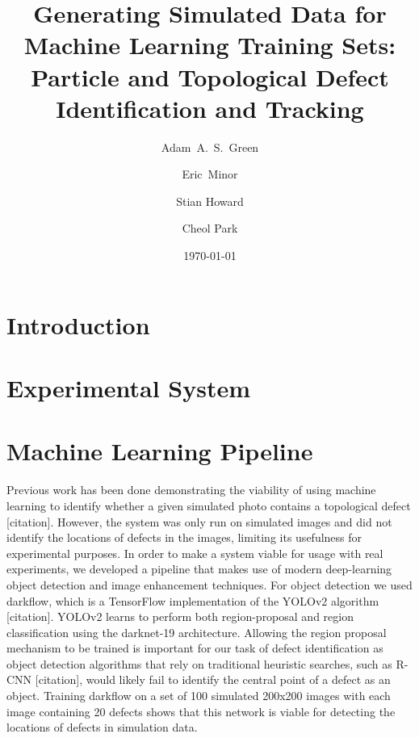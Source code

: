 \documentclass[prl,reprint,showpacs,floatfix,nofootinbib]{revtex4-1}
\begin{document}
\title{Generating Simulated Data for Machine Learning Training Sets: Particle and Topological Defect Identification and Tracking}

\date{\today}
\author{Adam~A.~S.~Green}
\author{Eric~Minor}
\author{Stian Howard}
\author{Cheol Park}


\begin{abstract}
    \blindtext{}
\end{abstract}

\maketitle

\section{Introduction}
\blindtext{}
\section{Experimental System}
\blindtext{}
\section{Machine Learning Pipeline}
Previous work has been done demonstrating the viability of using machine learning to identify whether a given simulated photo contains a topological defect [citation]. However, the system was only run on simulated images and did not identify the locations of defects in the images, limiting its usefulness for experimental purposes. In order to make a system viable for usage with real experiments, we developed a pipeline that makes use of modern deep-learning object detection and image enhancement techniques. For object detection we used darkflow, which is a TensorFlow implementation of the YOLOv2 algorithm [citation]. YOLOv2 learns to perform both region-proposal and region classification using the darknet-19 architecture. Allowing the region proposal mechanism to be trained is important for our task of defect identification as object detection algorithms that rely on traditional heuristic searches, such as R-CNN [citation], would likely fail to identify the central point of a defect as an object. Training darkflow on a set of 100 simulated 200x200 images with each image containing 20 defects shows that this network is viable for detecting the locations of defects in simulation data.
\end{document}
